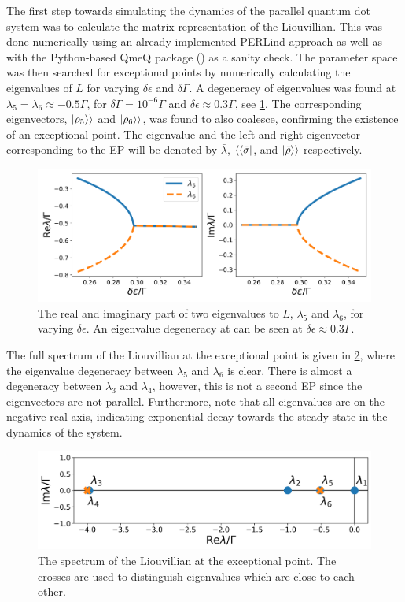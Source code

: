 \documentclass[../main.tex]{subfiles}
\begin{document}
The first step towards simulating the dynamics of the parallel quantum dot system was to calculate the matrix representation of the Liouvillian. This was done numerically using an already implemented PERLind approach as well as with the Python-based QmeQ package (\cite{qmeq}) as a sanity check. The parameter space was then searched for exceptional points by numerically calculating the eigenvalues of $L$ for varying $\delta\epsilon$ and $\delta\Gamma$. A degeneracy of eigenvalues was found at $\lambda_5 = \lambda_6\approx -0.5\Gamma$, for $\delta\Gamma = 10^{-6}\Gamma$ and $\delta\epsilon \approx 0.3\Gamma$, see \cref{fig:tuning}. The corresponding eigenvectors, $\ket{\rho_5}\rangle$ and $\ket{\rho_6}\rangle$, was found to also coalesce, confirming the existence of an exceptional point. The eigenvalue and the left and right eigenvector corresponding to the EP will be denoted by $\bar \lambda$, $\langle\bra{\bar\sigma}$, and $\ket{\bar\rho}\rangle$ respectively.
\begin{figure}[H]
    \centering
    \includegraphics[width=0.9\linewidth]{figures/tuning.png}
    \caption{The real and imaginary part of two eigenvalues to $L$, $\lambda_5$ and $\lambda_6$, for varying $\delta\epsilon$. An eigenvalue degeneracy at can be seen at $\delta\epsilon\approx0.3\Gamma$.}
    \label{fig:tuning}
\end{figure}

The full spectrum of the Liouvillian at the exceptional point is given in \cref{fig:spec}, where the eigenvalue degeneracy between $\lambda_5$ and $\lambda_6$ is clear. There is almost a degeneracy between $\lambda_3$ and $\lambda_4$, however, this is not a second EP since the eigenvectors are not parallel. Furthermore, note that all eigenvalues are on the negative real axis, indicating exponential decay towards the steady-state in the dynamics of the system. 
\begin{figure}[H]
    \centering
    \includegraphics[width=0.8\linewidth]{figures/spectrum.png}
    \caption{The spectrum of the Liouvillian at the exceptional point. The crosses are used to distinguish eigenvalues which are close to each other.}
    \label{fig:spec}
\end{figure}
\end{document}
